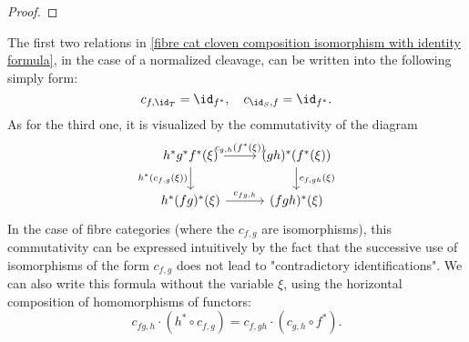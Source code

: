 \begin{proof}

\end{proof}
The first two relations in \cref{fibre cat cloven composition isomorphism with identity formula}, in the case of a normalized cleavage, can be written into the following simply form:
\begin{equation}\label{fibre cat cloven composition isomorphism with identity formula-3}
c_{f,\id_T}=\id_{f^*},\quad c_{\id_S,f}=\id_{f^*}.
\end{equation}
As for the third one, it is visualized by the commutativity of the diagram
\begin{equation}\label{fibre cat cloven composition isomorphism with identity formula-4}
\begin{tikzcd}
h^*g^*f^*(\xi)\ar[r,"c_{g,h}(f^*(\xi))"]\ar[d,swap,"h^*(c_{f,g}(\xi))"]&(gh)^*(f^*(\xi))\ar[d,"c_{f,gh}(\xi)"]\\
h^*(fg)^*(\xi)\ar[r,"c_{fg,h}"]&(fgh)^*(\xi)
\end{tikzcd}
\end{equation}
In the case of fibre categories (where the $c_{f,g}$ are isomorphisms), this commutativity can be expressed intuitively by the fact that the successive use of isomorphisms of the form $c_{f,g}$ does not lead to "contradictory identifications". We can also write this formula without the variable $\xi$, using the horizontal composition of homomorphisms of functors:
\[c_{fg,h}\cdot(h^*\circ c_{f,g})=c_{f,gh}\cdot(c_{g,h}\circ f^*).\]

